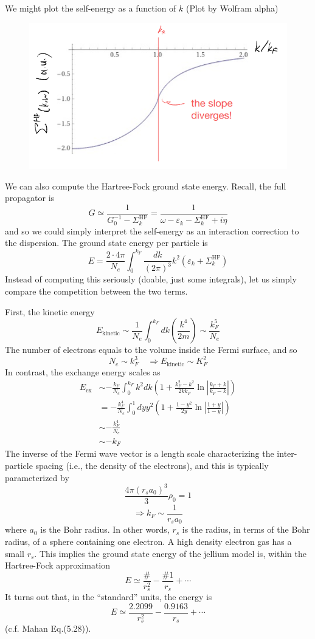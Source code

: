 We might plot the self-energy as a function of $k$ (Plot by Wolfram alpha)
\begin{figure}[H]
    \centering
    \includegraphics[width=\textwidth]{jupyterbook/data/fig/lec19-fig03.png}
\end{figure}
We can also compute the Hartree-Fock ground state energy. Recall, the full propagator is
\[ G\simeq \frac{1}{G_{0}^{-1}-\Sigma _{k}^{\mathrm{HF}}}=\frac{1}{\omega -\varepsilon _k-\Sigma _{k}^{\mathrm{HF}}+i\eta}\]
and so we could simply interpret the self-energy as an interaction correction to the dispersion. The ground state energy per particle is
\[ E=\frac{2\cdot 4\pi}{N_e}\int_0^{k_F}{\frac{dk}{\left( 2\pi \right) ^3}k^2\left( \varepsilon _k+\Sigma _{k}^{\mathrm{HF}} \right)}\]
Instead of computing this seriously (doable, just some integrals), let us simply compare the competition between the two terms.

First, the kinetic energy
\[ E_{\mathrm{kinetic}}\sim \frac{1}{N_e}\int_0^{k_F}{dk\left( \frac{k^4}{2m} \right)}\sim \frac{k_{F}^{5}}{N_e}\]
The number of electrons equals to the volume inside the Fermi surface, and so
\[ N_e\sim k_{F}^{3}\quad \Rightarrow E_{\mathrm{kinetic}}\sim K_{F}^{2}\]
In contrast, the exchange energy scales as
\begin{align*}
    E_{\mathrm{ex}}&\sim -\frac{k_F}{N_e}\int_0^{k_F}{k^2dk\left( 1+\frac{k_{F}^{2}-k^2}{2kk_F}\ln \left| \frac{k_F+k}{k_F-k} \right| \right)}\\
    &=-\frac{k_{F}^{4}}{N_e}\int_0^1{dyy^2\left( 1+\frac{1-y^2}{2y}\ln \left| \frac{1+y}{1-y} \right| \right)}\\
    &\sim -\frac{k_{F}^{4}}{N_e}\\
    &\sim -k_F
\end{align*}
The inverse of the Fermi wave vector is a length scale characterizing the inter-particle spacing (i.e., the density of the electrons), and this is typically parameterized by
\[ \frac{4\pi \left( r_sa_0 \right) ^3}{3}\rho _0=1\]
\[ \Rightarrow k_F\sim \frac{1}{r_sa_0}\]
where $a_0$ is the Bohr radius. In other words, $r_s$ is the radius, in terms of the Bohr radius, of a sphere containing one electron. A high density electron gas has a small $r_s$. This implies the ground state energy of the jellium model is, within the Hartree-Fock approximation
\[ E\simeq \frac{\#}{r_{s}^{2}}-\frac{\#1}{r_s}+\cdots \]
It turns out that, in the ``standard'' units, the energy is
\[ E\simeq \frac{2.2099}{r_{s}^{2}}-\frac{0.9163}{r_s}+\cdots \]
(c.f. Mahan Eq.(5.28)).

